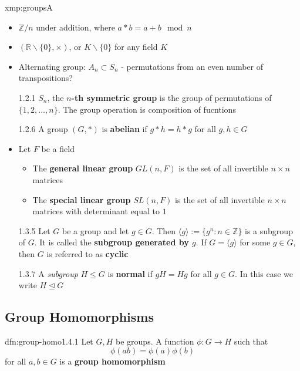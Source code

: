 \documentclass{article}
\begin{document}
\begin{xmp}{xmp:groups}{A}
    \begin{itemize}
        \item $\mathbb{Z} / n$ under addition, where $a * b = a + b \mod n$
        \item $(\mathbb{R} \backslash \{0\}, \times)$, or $K \backslash \{0\}$ for any field $K$
        \item Alternating group: $A_{n} \subset S_{n}$ - permutations from an even number of transpositions?
        \item[1.2.1] $S_{n}$, the \textbf{$n$-th symmetric group} is the group of permutations of $\{1,2,\dots,n\}$. The group operation is composition of fucntions
        \item[1.2.6] A group $(G, *)$ is \textbf{abelian} if $g * h = h * g$ for all $g, h\in G$
        \item Let $F$ be a field
            \begin{itemize}
                \item The \textbf{general linear group} $GL(n, F)$ is the set of all invertible $n \times n$ matrices
                \item The \textbf{special linear group} $SL (n, F)$ is the set of all invertible $n \times n$ matrices with determinant equal to $1$
            \end{itemize}
        \item[1.3.5] Let $G$ be a group and let $g\in G$. Then $\langle g \rangle := \{g^{n} : n\in \mathbb{Z}\}$ is a subgroup of $G$. It is called the \textbf{subgroup generated by $g$}. If $G = \langle g \rangle$ for some $g\in G$, then $G$ is referred to as \textbf{cyclic}
        \item[1.3.7] A \textit{subgroup} $H \le G$ is \textbf{normal} if $gH = Hg$ for all $g\in G$. In this case we write $H \unlhd G$
    \end{itemize}
\end{xmp}

\newpage
\subsection{Group Homomorphisms}

\begin{dfn}{dfn:group-homo}{1.4.1}
    Let $G, H$ be groups. A function $\phi : G \to H$ such that
    \[\phi(ab) = \phi(a)\phi(b)\]
    for all $a, b\in G$ is a \textbf{group homomorphism}
\end{dfn}
\end{document}
